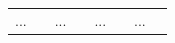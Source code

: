 \documentclass[8pt,xcolor=table,aspectratio=169]{beamer}
\begin{document}
\begin{frame}
\begin{columns}
\begin{column}[t]{0.5\textwidth}
\begin{table}
\begin{tabular}{lc|cc|cc|cc}
... & & ... & & ... & & ... & \\ 

\end{tabular}
\end{table}
\end{column}
\end{columns}
\end{frame}
\end{document}
